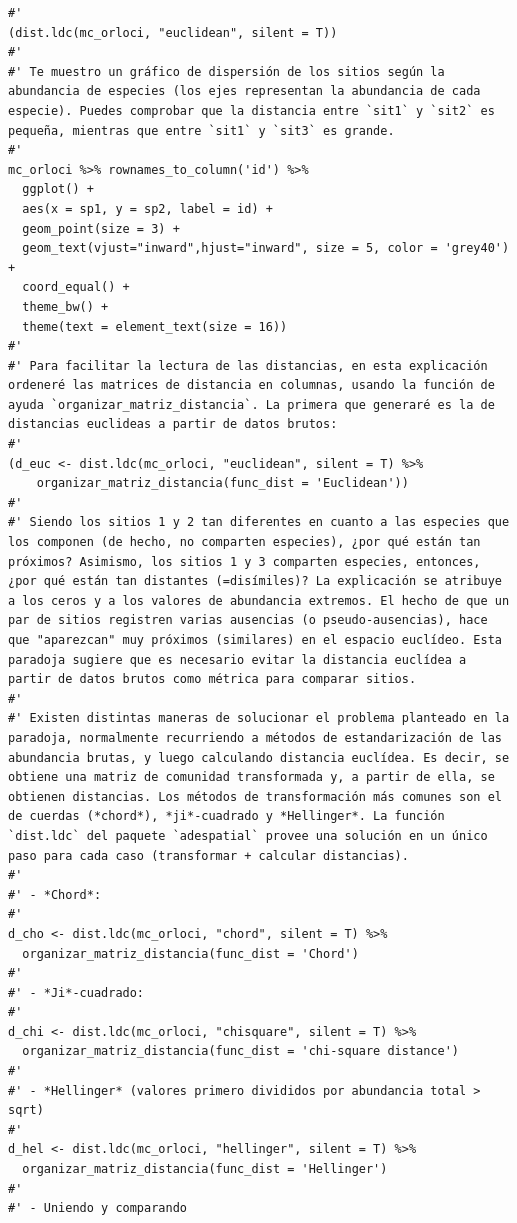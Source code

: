 \documentclass[11pt,]{article}
\begin{document}
\begin{verbatim}
#' 
(dist.ldc(mc_orloci, "euclidean", silent = T))
#' 
#' Te muestro un gráfico de dispersión de los sitios según la abundancia de especies (los ejes representan la abundancia de cada especie). Puedes comprobar que la distancia entre `sit1` y `sit2` es pequeña, mientras que entre `sit1` y `sit3` es grande.
#' 
mc_orloci %>% rownames_to_column('id') %>% 
  ggplot() +
  aes(x = sp1, y = sp2, label = id) +
  geom_point(size = 3) +
  geom_text(vjust="inward",hjust="inward", size = 5, color = 'grey40') +
  coord_equal() +
  theme_bw() +
  theme(text = element_text(size = 16))
#'
#' Para facilitar la lectura de las distancias, en esta explicación ordeneré las matrices de distancia en columnas, usando la función de ayuda `organizar_matriz_distancia`. La primera que generaré es la de distancias euclideas a partir de datos brutos:
#' 
(d_euc <- dist.ldc(mc_orloci, "euclidean", silent = T) %>%
    organizar_matriz_distancia(func_dist = 'Euclidean'))
#' 
#' Siendo los sitios 1 y 2 tan diferentes en cuanto a las especies que los componen (de hecho, no comparten especies), ¿por qué están tan próximos? Asimismo, los sitios 1 y 3 comparten especies, entonces, ¿por qué están tan distantes (=disímiles)? La explicación se atribuye a los ceros y a los valores de abundancia extremos. El hecho de que un par de sitios registren varias ausencias (o pseudo-ausencias), hace que "aparezcan" muy próximos (similares) en el espacio euclídeo. Esta paradoja sugiere que es necesario evitar la distancia euclídea a partir de datos brutos como métrica para comparar sitios.
#' 
#' Existen distintas maneras de solucionar el problema planteado en la paradoja, normalmente recurriendo a métodos de estandarización de las abundancia brutas, y luego calculando distancia euclídea. Es decir, se obtiene una matriz de comunidad transformada y, a partir de ella, se obtienen distancias. Los métodos de transformación más comunes son el de cuerdas (*chord*), *ji*-cuadrado y *Hellinger*. La función `dist.ldc` del paquete `adespatial` provee una solución en un único paso para cada caso (transformar + calcular distancias).
#' 
#' - *Chord*:
#' 
d_cho <- dist.ldc(mc_orloci, "chord", silent = T) %>%
  organizar_matriz_distancia(func_dist = 'Chord')
#' 
#' - *Ji*-cuadrado:
#' 
d_chi <- dist.ldc(mc_orloci, "chisquare", silent = T) %>%
  organizar_matriz_distancia(func_dist = 'chi-square distance')
#' 
#' - *Hellinger* (valores primero divididos por abundancia total > sqrt)
#' 
d_hel <- dist.ldc(mc_orloci, "hellinger", silent = T) %>%
  organizar_matriz_distancia(func_dist = 'Hellinger')
#' 
#' - Uniendo y comparando

\end{verbatim}
\end{document}
